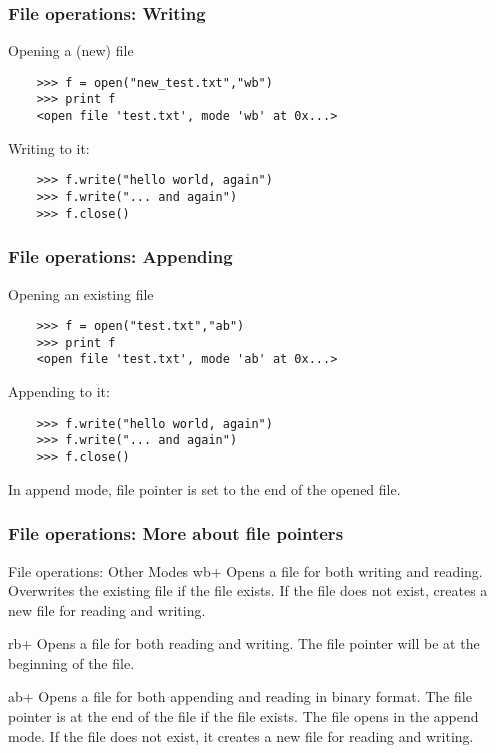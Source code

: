 \documentclass[xcolor=table,10pt, handout]{beamer}
\let\svpar\par
\let\svitemize\itemize
\let\svenditemize\enditemize
\let\svitem\item
\def\newpar{\def\par{\svpar\vfill}}
\def\newitem{\def\item{\vfill\svitem}}
\let\svcenter\center
\let\svendcenter\endcenter
\let\svcolumn\column
\let\svendcolumn\endcolumn
\newlength\columnskip
\def\newcolumn{%
  \renewenvironment{column}[2]%
    {\svcolumn{##1}\setlength{\parskip}{\columnskip}##2}%
    {\svendcolumn\vspace{\columnskip}}}
\newcommand\stretchy{\only<2>{%
  \newpar\def\item{\svitem\newitem}%
  \renewenvironment{itemize}{\svitemize}{\svenditemize\newpar\par}%
  \renewenvironment{center}{\svcenter\newpar}{\svendcenter\newpar}%
  \newcolumn
}}
\begin{document}
\begin{frame}[fragile]

  \frametitle{File operations: Writing}

  Opening a (new) file 

  \begin{verbatim}
    >>> f = open("new_test.txt","wb")
    >>> print f
    <open file 'test.txt', mode 'wb' at 0x...>
  \end{verbatim}
  \bigskip
  \pause
  Writing to it:
  \begin{verbatim}
    >>> f.write("hello world, again")
    >>> f.write("... and again")
    >>> f.close()
  \end{verbatim}
  \pause
  \bigskip

\end{frame}

\begin{frame}[fragile]

  \frametitle{File operations: Appending}

  Opening an existing file 

  \begin{verbatim}
    >>> f = open("test.txt","ab")
    >>> print f
    <open file 'test.txt', mode 'ab' at 0x...>
  \end{verbatim}
  \bigskip
  \pause  

  Appending to it:
  \begin{verbatim}
    >>> f.write("hello world, again")
    >>> f.write("... and again")
    >>> f.close()
  \end{verbatim}
  \pause
  \bigskip

  \begin{arrowlist}
  \item In append mode, file pointer is set to the end of the opened file.
  \end{arrowlist}

\end{frame}


\begin{frame}[fragile]

  \frametitle{File operations: More about file pointers}

  
\end{frame}
%

\begin{frame}[fragile]{File operations: Other Modes}
  \stretchy
  wb+ Opens a file for both writing and reading. Overwrites the
  existing file if the file exists. If the file does not exist, creates
  a new file for reading and writing.

  rb+ Opens a file for both reading and writing. The file pointer will
  be at the beginning of the file.

  ab+ Opens a file for both appending and reading in binary
  format. The file pointer is at the end of the file if the file
  exists. The file opens in the append mode. If the file does not exist,
  it creates a new file for reading and writing.
\end{frame}
\end{document}
